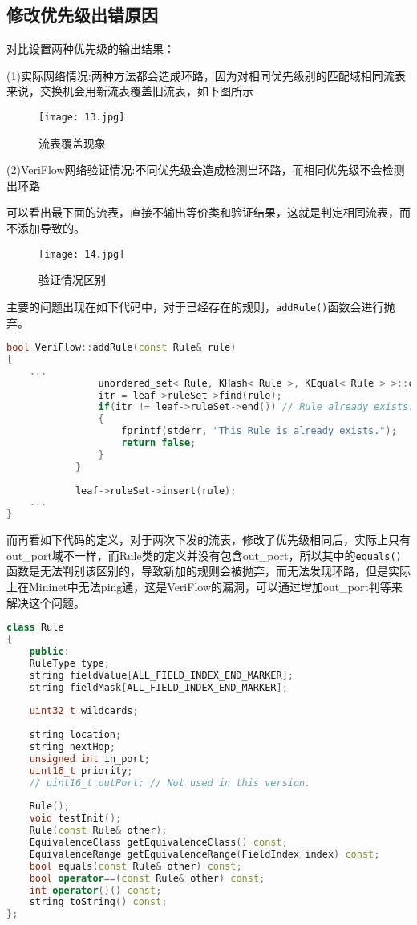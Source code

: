 \documentclass{xjtureport}
\begin{document}
\subsection{修改优先级出错原因}
对比设置两种优先级的输出结果：\par 
(1)实际网络情况:两种方法都会造成环路，因为对相同优先级别的匹配域相同流表来说，交换机会用新流表覆盖旧流表，如下图所示\par
\begin{figure}[H]
	\centering
	\texttt{[image: 13.jpg]}
	\caption{流表覆盖现象}
\end{figure}
(2)VeriFlow网络验证情况:不同优先级会造成检测出环路，而相同优先级不会检测出环路\par
可以看出最下面的流表，直接不输出等价类和验证结果，这就是判定相同流表，而不添加导致的。\par
\begin{figure}[H]
	\centering
	\texttt{[image: 14.jpg]}
	\caption{验证情况区别}
\end{figure}
主要的问题出现在如下代码中，对于已经存在的规则，\texttt{addRule()}函数会进行抛弃。
\begin{lstlisting}[language=c++]
bool VeriFlow::addRule(const Rule& rule)
{
	...
				unordered_set< Rule, KHash< Rule >, KEqual< Rule > >::const_iterator itr;
				itr = leaf->ruleSet->find(rule);
				if(itr != leaf->ruleSet->end()) // Rule already exists.
				{
					fprintf(stderr, "This Rule is already exists.");
					return false;
				}
			}
			
			leaf->ruleSet->insert(rule);
	...
}
\end{lstlisting}
\quad \quad 而再看如下代码的定义，对于两次下发的流表，修改了优先级相同后，实际上只有out\_port域不一样，而Rule类的定义并没有包含out\_port，所以其中的\texttt{equals()}函数是无法判别该区别的，导致新加的规则会被抛弃，而无法发现环路，但是实际上在Mininet中无法ping通，这是VeriFlow的漏洞，可以通过增加out\_port判等来解决这个问题。
\begin{lstlisting}[language=c++]
class Rule
{
	public:
	RuleType type;
	string fieldValue[ALL_FIELD_INDEX_END_MARKER];
	string fieldMask[ALL_FIELD_INDEX_END_MARKER];
	
	uint32_t wildcards;
	
	string location;
	string nextHop;
	unsigned int in_port;
	uint16_t priority;
	// uint16_t outPort; // Not used in this version.
	
	Rule();
	void testInit();
	Rule(const Rule& other);
	EquivalenceClass getEquivalenceClass() const;
	EquivalenceRange getEquivalenceRange(FieldIndex index) const;
	bool equals(const Rule& other) const;
	bool operator==(const Rule& other) const;
	int operator()() const;
	string toString() const;
};
\end{lstlisting}
\end{document}
